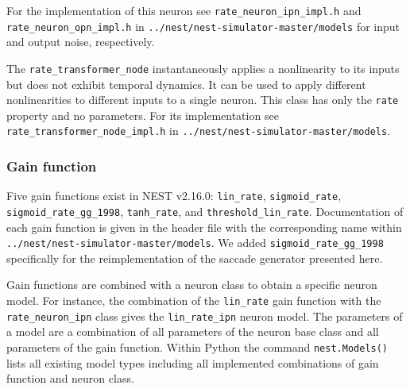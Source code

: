 \documentclass[10pt,a4paper,onecolumn]{article}
\begin{document}
For the implementation of this neuron see
\texttt{rate\_neuron\_ipn\_impl.h} and\\
\texttt{rate\_neuron\_opn\_impl.h} in
\texttt{../nest/nest-simulator-master/models} for input and output
noise, respectively.

The \texttt{rate\_transformer\_node} instantaneously applies a
nonlinearity to its inputs but does not exhibit temporal dynamics. It
can be used to apply different nonlinearities to different inputs to a
single neuron. This class has only the \texttt{rate} property and no
parameters. For its implementation see
\texttt{rate\_transformer\_node\_impl.h} in
\texttt{../nest/nest-simulator-master/models}.

\subsubsection{Gain function}\label{gain-function}

Five gain functions exist in NEST v2.16.0: \texttt{lin\_rate},
\texttt{sigmoid\_rate},\\
\texttt{sigmoid\_rate\_gg\_1998}, \texttt{tanh\_rate}, and
\texttt{threshold\_lin\_rate}. Documentation of each gain function is
given in the header file with the corresponding name within
\texttt{../nest/nest-simulator-master/models}. We added
\texttt{sigmoid\_rate\_gg\_1998} specifically for the reimplementation
of the saccade generator presented here.

Gain functions are combined with a neuron class to obtain a specific
neuron model. For instance, the combination of the \texttt{lin\_rate}
gain function with the \texttt{rate\_neuron\_ipn} class gives the
\texttt{lin\_rate\_ipn} neuron model. The parameters of a model are a
combination of all parameters of the neuron base class and all
parameters of the gain function. Within Python the command
\texttt{nest.Models()} lists all existing model types including all
implemented combinations of gain function and neuron class.

{\sffamily \small
  \printbibliography[title=References]
}
\end{document}
